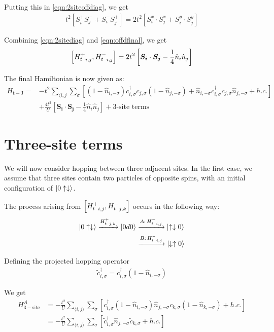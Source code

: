 \documentclass[]{report}
\renewcommand{\vec}{\bm}
\begin{document}
Putting this in \eqref{eqn:2siteoffdiag}, we get
\begin{align}\label{eqn:offdfinal}
t^2 \left[ S^{+}_{i}S^{-}_{j} + S^{-}_{i}S^{+}_{j} \right] = 2 t^2 \left[ S^{x}_i \cdot S^{x}_j + S^{y}_i \cdot S^{y}_j \right]
\end{align}

Combining \eqref{eqn:2sitediag} and \eqref{eqn:offdfinal}, we get
\begin{align}
\comm{ {H^{+}_{t}}_{i,j} }{ {H^{-}_{t}}_{i,j} } = 2 t^2 \left[ \vec{S_{i}} \cdot \vec{S_{j}} - \frac{1}{4} \hat{n}_i \hat{n}_j \right]
\end{align}

The final Hamiltonian is now given as:
\begin{align}\label{eqn:Htj}
\nonumber
H_{\mathrm{t-J}} =& -t^2 \sum_{\langle i,j } \sum_\sigma\left[ (1 - \hat{n}_{i, -\sigma}) c^{\dagger}_{i, \sigma} c_{j, \sigma} (1 - \hat{n}_{j, -\sigma}) + \hat{n}_{i, -\sigma} c^{\dagger}_{i, \sigma} c_{j, \sigma} \hat{n}_{j, -\sigma} + h.c. \right]\\ &+ \frac{4 t^2}{U} \left[ \vec{S_{i}} \cdot \vec{S_{j}} - \frac{1}{4} \hat{n}_i \hat{n}_j \right] + \text{3-site terms}
\end{align}

\section{Three-site terms}
We will now consider hopping between three adjacent sites. In the first case, we assume that three sites contain two particles of opposite spins, with an initial configuration of $ \ket{0\uparrow\downarrow} $.

The process arising from $ \comm{ {H^{+}_{t}}_{i,j} }{ {H^{-}_{t}}_{j,k} } $ occurs in the following way:
\begin{align*}
\ket{0\uparrow\downarrow} \xrightarrow{ {H^{+}_{t}}_{j,k} } \ket{0d0} &\xrightarrow{A:\, {H^{-}_{t}}_{i,j}} \ket{\uparrow \downarrow 0}\\
&\xrightarrow{B:\, {H^{-}_{t}}_{i,j}} \ket{\downarrow \uparrow  0}
\end{align*}

Defining the projected hopping operator
\begin{align}
\tilde{c}^{\dagger}_{i,\sigma} = c^{\dagger}_{i,\sigma} (1 - \hat{n}_{i, -\sigma})
\end{align}

We get
\begin{align}
\nonumber
H^{A}_{\mathrm{3-site}} &= -\frac{t^2}{U} \sum_{\langle i,j \rangle} \sum_\sigma \left[ c^{\dagger}_{i, \sigma} (1 - \hat{n}_{i, -\sigma}) \hat{n}_{j, -\sigma} c_{k, \sigma} (1 - \hat{n}_{k, -\sigma}) + h.c.\right]\\
&=
-\frac{t^2}{U} \sum_{\langle i,j \rangle} \sum_\sigma \left[ \tilde{c}^{\dagger}_{i, \sigma} \hat{n}_{j, -\sigma} \tilde{c}_{k, \sigma} + h.c. \right]
\end{align}
\end{document}
